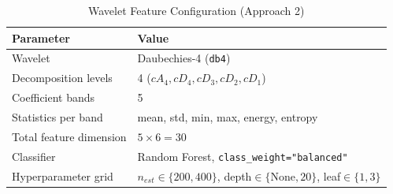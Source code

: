 \begin{table}[t]
\caption{Wavelet Feature Configuration (Approach 2)}
\label{tab:dwt}
\centering
\begin{tabular}{@{}p{}p{}@{}}
\toprule
\textbf{Parameter} & \textbf{Value} \\
\midrule
Wavelet & Daubechies-4 (\texttt{db4}) \\
Decomposition levels & 4 ($cA_4, cD_4, cD_3, cD_2, cD_1$) \\
Coefficient bands & 5 \\
Statistics per band & mean, std, min, max, energy, entropy \\
Total feature dimension & $5 \times 6 = 30$ \\
Classifier & Random Forest, \texttt{class\_weight="balanced"} \\
Hyperparameter grid & $n_{est}\!\in\!\{200,400\}$, depth$\in\{$None$,20\}$, leaf$\in\{1,3\}$ \\
\bottomrule
\end{tabular}
\end{table}
